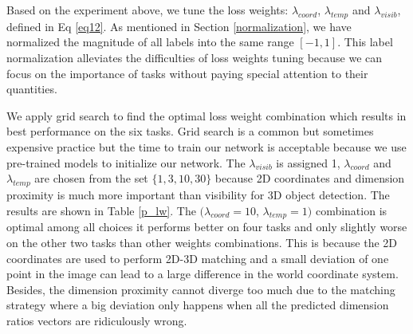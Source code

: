 \documentclass[a4paper,12pt]{article}
\begin{document}
Based on the experiment above, we tune the loss weights: $\lambda_{coord}$, $\lambda_{temp}$ and $\lambda_{visib}$, defined in Eq \ref{eq12}. As mentioned in Section \ref{normalization}, we have normalized the magnitude of all labels into the same range $[-1, 1]$. This label normalization alleviates the difficulties of loss weights tuning because we can focus on the importance of tasks without paying special attention to their quantities.


We apply grid search to find the optimal loss weight combination which results in best performance on the six tasks. Grid search is a common but sometimes expensive practice \cite{Goodfellow-et-al-2016} but the time to train our network is acceptable because we use pre-trained models to initialize our network. The $\lambda_{visib}$ is assigned 1, $\lambda_{coord}$ and $\lambda_{temp}$ are chosen from the set $\{1, 3, 10, 30\}$ because 2D coordinates and dimension proximity is much more important than visibility for 3D object detection. The results are shown in Table \ref{p_lw}. The $(\lambda_{coord}=10$, $\lambda_{temp}=1)$ combination is optimal among all choices \ie it performs better on four tasks and only slightly worse on the other two tasks than other weights combinations. This is because the 2D coordinates are used to perform 2D-3D matching and a small deviation of one point in the image can lead to a large difference in the world coordinate system. Besides, the dimension proximity cannot diverge too much due to the matching strategy where a big deviation only happens when all the predicted dimension ratios vectors are ridiculously wrong.
\end{document}
